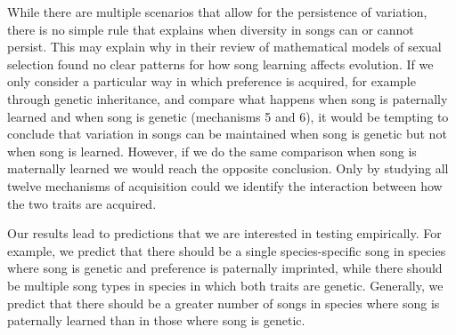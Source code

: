\documentclass[12pt]{article}
\begin{document}
While there are multiple scenarios that allow for the persistence of variation, there is no simple rule that explains when diversity in songs can or cannot persist. This may explain why \citet{Verzijden:2012uq} in their review of mathematical models of sexual selection found no clear patterns for how song learning affects evolution. If we only consider a particular way in which preference is acquired, for example through genetic inheritance, and compare what happens when song is paternally learned and when song is genetic (mechanisms 5 and 6), it would be tempting to conclude that variation in songs can be maintained when song is genetic but not when song is learned. However, if we do the same comparison when song is maternally learned we would reach the opposite conclusion. Only by studying all twelve mechanisms of acquisition could we identify the interaction between how the two traits are acquired. 

Our results lead to predictions that we are interested in testing empirically. For example, we predict that there should be a single species-specific song in species where song is genetic and preference is paternally imprinted, while there should be multiple song types in species in which both traits are genetic. Generally, we predict that there should be a greater number of songs in species where song is paternally learned than in those where song is genetic.
 
\end{document}
